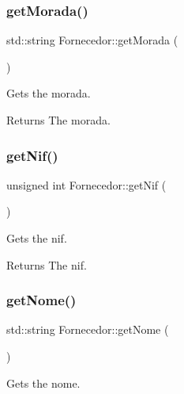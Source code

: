 \subsubsection{\texorpdfstring{get\+Morada()}{getMorada()}}
{\footnotesize\ttfamily std\+::string Fornecedor\+::get\+Morada (\begin{DoxyParamCaption}{ }\end{DoxyParamCaption})\hspace{0.3cm}{\ttfamily [inline]}}



Gets the morada. 

\begin{DoxyReturn}{Returns}
The morada. 
\end{DoxyReturn}
\mbox{\label{classFornecedor_aec536b071f628fc1aa468071fa5a6067}} 
\subsubsection{\texorpdfstring{get\+Nif()}{getNif()}}
{\footnotesize\ttfamily unsigned int Fornecedor\+::get\+Nif (\begin{DoxyParamCaption}{ }\end{DoxyParamCaption})\hspace{0.3cm}{\ttfamily [inline]}}



Gets the nif. 

\begin{DoxyReturn}{Returns}
The nif. 
\end{DoxyReturn}
\mbox{\label{classFornecedor_a8d14dd862259e29adef0e283f15cbb16}} 
\subsubsection{\texorpdfstring{get\+Nome()}{getNome()}}
{\footnotesize\ttfamily std\+::string Fornecedor\+::get\+Nome (\begin{DoxyParamCaption}{ }\end{DoxyParamCaption})\hspace{0.3cm}{\ttfamily [inline]}}



Gets the nome. 


